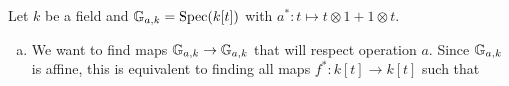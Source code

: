\begin{exercise}{2}
    Let $k$ be a field and $\mathbb{G}_{a, k} = \operatorname{Spec}(k[t])$ with $a^* \colon t
    \mapsto t \otimes 1 + 1 \otimes t$.
    \begin{enumerate}[a)]
        \item{
                We want to find maps $\mathbb{G}_{a, k} \to \mathbb{G}_{a, k}$ that will respect
                operation $a$. Since $\mathbb{G}_{a, k}$ is affine, this is equivalent to
                finding all maps $f^* \colon k[t] \to k[t]$ such that


}
\end{enumerate}
\end{exercise}
